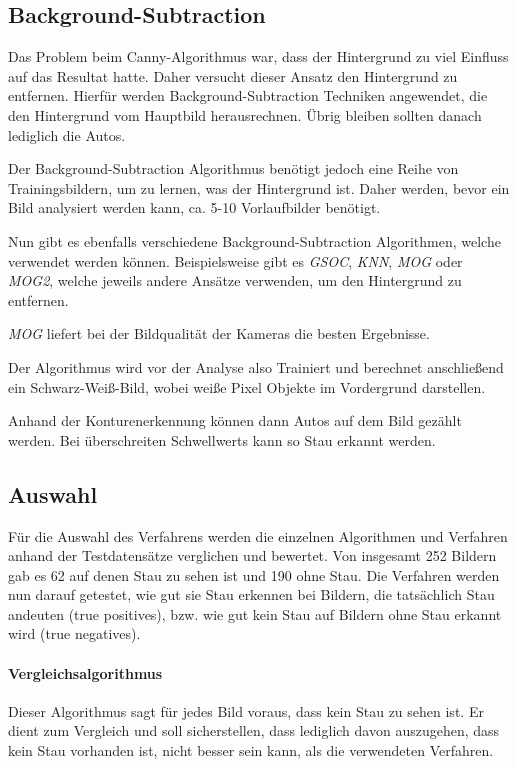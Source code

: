 \subsection{Background-Subtraction}
Das Problem beim Canny-Algorithmus war, dass der Hintergrund zu viel Einfluss auf das Resultat hatte.
Daher versucht dieser Ansatz den Hintergrund zu entfernen. Hierfür werden Background-Subtraction Techniken angewendet, die den Hintergrund
vom Hauptbild herausrechnen. Übrig bleiben sollten danach lediglich die Autos.

Der Background-Subtraction Algorithmus benötigt jedoch eine Reihe von Trainingsbildern, um zu lernen, was der Hintergrund ist.
Daher werden, bevor ein Bild analysiert werden kann, ca. 5-10 Vorlaufbilder benötigt.

Nun gibt es ebenfalls verschiedene Background-Subtraction Algorithmen, welche verwendet werden können. Beispielsweise gibt es {\em GSOC}, {\em KNN}, {\em MOG} oder {\em MOG2}, welche jeweils andere Ansätze verwenden, um den Hintergrund zu entfernen.

{\em MOG} liefert bei der Bildqualität der Kameras die besten Ergebnisse.

Der Algorithmus wird vor der Analyse also Trainiert und berechnet anschließend ein Schwarz-Weiß-Bild, wobei weiße Pixel Objekte im Vordergrund darstellen.

Anhand der Konturenerkennung können dann Autos auf dem Bild gezählt werden. Bei überschreiten Schwellwerts kann so Stau erkannt werden.

\subsection{Auswahl}
Für die Auswahl des Verfahrens werden die einzelnen Algorithmen und Verfahren anhand der Testdatensätze verglichen und bewertet.
Von insgesamt 252 Bildern gab es 62 auf denen Stau zu sehen ist und 190 ohne Stau.
Die Verfahren werden nun darauf getestet, wie gut sie Stau erkennen bei Bildern, die tatsächlich Stau andeuten (true positives), bzw. wie gut kein Stau auf Bildern ohne Stau erkannt wird (true negatives).

\paragraph{Vergleichsalgorithmus}
Dieser Algorithmus sagt für jedes Bild voraus, dass kein Stau zu sehen ist. Er dient zum Vergleich und soll sicherstellen, dass lediglich davon auszugehen, dass kein Stau vorhanden ist, nicht besser sein kann, als die verwendeten Verfahren.

